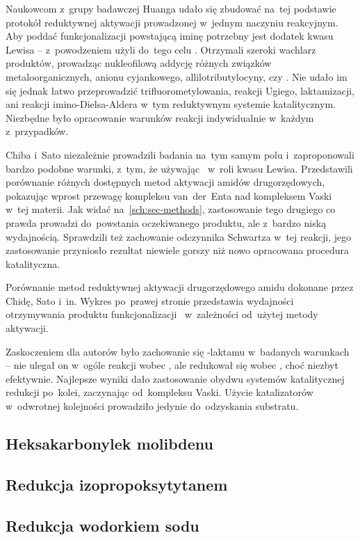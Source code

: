 Naukowcom z~grupy badawczej Huanga udało się zbudować na~tej podstawie protokół reduktywnej
  aktywacji prowadzonej w~jednym naczyniu reakcyjnym.
Aby poddać funkcjonalizacji powstającą iminę potrzebny jest dodatek kwasu Lewisa \---
  \citeauthor{ou18} z~powodzeniem użyli do~tego celu .
Otrzymali szeroki wachlarz produktów, prowadząc nukleofilową addycję różnych związków
  metaloorganicznych, anionu cyjankowego, allilotributylocyny, czy .
Nie udało im się jednak łatwo przeprowadzić trifluorometylowania, reakcji Ugiego, laktamizacji,
  ani reakcji imino-Dielsa-Aldera w~tym reduktywnym systemie katalitycznym.
Niezbędne było opracowanie warunków reakcji indywidualnie w~każdym z~przypadków.

Chiba i~Sato niezależnie prowadzili badania na~tym samym polu i~zaproponowali bardzo podobne
  warunki, z~tym, że używając~ w~roli kwasu Lewisa.
Przedstawili porównanie różnych dostępnych metod aktywacji amidów drugorzędowych,
  pokazując wprost przewagę kompleksu van~der~Enta nad kompleksem Vaski w~tej materii.
Jak widać na~\cref{sch:sec-methods}, zastosowanie tego drugiego co prawda prowadzi
  do~powstania oczekiwanego produktu, ale z~bardzo niską wydajnością.
Sprawdzili też zachowanie odczynnika Schwartza w~tej reakcji, jego zastosowanie przyniosło
  rezultat niewiele gorszy niż nowo opracowana procedura katalityczna.
\begin{scheme*}
  
  \caption{
    Porównanie metod reduktywnej aktywacji drugorzędowego amidu dokonane przez Chidę, Sato i~in.
    Wykres po~prawej stronie przedstawia wydajności otrzymywania produktu
      funkcjonalizacji~ w~zależności od~użytej metody aktywacji.
  }
  \label{sch:sec-methods}
\end{scheme*}

Zaskoczeniem dla autorów było zachowanie się \textgamma{}-laktamu w~badanych warunkach \---
  nie ulegał on w~ogóle reakcji wobec , ale redukował się wobec \vaska{},
  choć niezbyt efektywnie.
Najlepsze wyniki dało zastosowanie obydwu systemów katalitycznej redukcji po~kolei,
  zaczynając od~kompleksu Vaski.
Użycie katalizatorów w~odwrotnej kolejności prowadziło jedynie do~odzyskania substratu.

\subsection{Heksakarbonylek molibdenu}\label{literature:new:molydenium}
\subsection{Redukcja izopropoksytytanem}\label{literature:new:titanium}
\subsection{Redukcja wodorkiem sodu}\label{literature:new:sodium-hydride}
